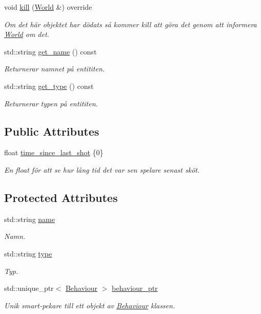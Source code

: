 \begin{DoxyCompactItemize}
void \hyperlink{classPlayer_ab015823a5707509c3611ff93984100d9}{kill} (\hyperlink{classWorld}{World} \&) override
\begin{DoxyCompactList}\small\item\em Om det här objektet har dödats så kommer kill att göra det genom att informera \hyperlink{classWorld}{World} om det. \end{DoxyCompactList}\item 
std\+::string \hyperlink{classEntity_a75c7e4aad3df2e053ee5b43169509534}{get\+\_\+name} () const 
\begin{DoxyCompactList}\small\item\em Returnerar namnet på entititen. \end{DoxyCompactList}\item 
std\+::string \hyperlink{classEntity_a0e9ef479c1147e21e5bcb338cb858df2}{get\+\_\+type} () const 
\begin{DoxyCompactList}\small\item\em Returnerar typen på entititen. \end{DoxyCompactList}\end{DoxyCompactItemize}
\subsection*{Public Attributes}
\begin{DoxyCompactItemize}
\item 
float \hyperlink{classPlayer_a75e887d14a0eafeeba86bec0e9a8d086}{time\+\_\+since\+\_\+last\+\_\+shot} \{0\}
\begin{DoxyCompactList}\small\item\em En float för att se hur lång tid det var sen spelare senast sköt. \end{DoxyCompactList}\end{DoxyCompactItemize}
\subsection*{Protected Attributes}
\begin{DoxyCompactItemize}
\item 
std\+::string \hyperlink{classEntity_a931b21fbdebb1a5963b4bcab5df128f5}{name}
\begin{DoxyCompactList}\small\item\em Namn. \end{DoxyCompactList}\item 
std\+::string \hyperlink{classEntity_a298a9ebf2474bb00874b5ff6a0d637ef}{type}
\begin{DoxyCompactList}\small\item\em Typ. \end{DoxyCompactList}\item 
std\+::unique\+\_\+ptr$<$ \hyperlink{classBehaviour}{Behaviour} $>$ \hyperlink{classEntity_adb6e36848db24e6d48e6d295e19d3972}{behaviour\+\_\+ptr}
\begin{DoxyCompactList}\small\item\em Unik smart-\/pekare till ett objekt av \hyperlink{classBehaviour}{Behaviour} klassen. \end{DoxyCompactList}\end{DoxyCompactItemize}


